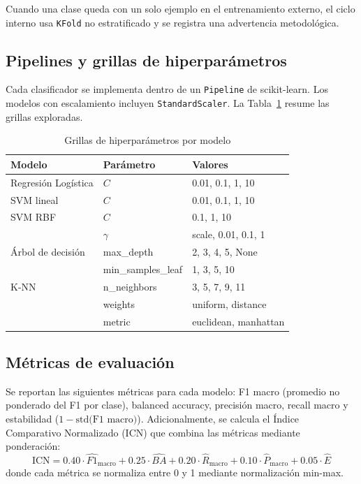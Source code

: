 \documentclass[conference]{IEEEtran}
\begin{document}
Cuando una clase queda con un solo ejemplo en el entrenamiento externo, el ciclo interno usa \texttt{KFold} no estratificado y se registra una advertencia metodológica.

\subsection{Pipelines y grillas de hiperparámetros}
Cada clasificador se implementa dentro de un \texttt{Pipeline} de scikit-learn. Los modelos con escalamiento incluyen \texttt{StandardScaler}. La Tabla~\ref{tab:grids} resume las grillas exploradas.

\begin{table}[h]
\centering
\caption{Grillas de hiperparámetros por modelo}
\label{tab:grids}
\begin{tabular}{lll}
\toprule
\textbf{Modelo} & \textbf{Parámetro} & \textbf{Valores} \\
\midrule
Regresión Logística & \(C\) & 0.01, 0.1, 1, 10 \\
SVM lineal & \(C\) & 0.01, 0.1, 1, 10 \\
SVM RBF & \(C\) & 0.1, 1, 10 \\
 & \(\gamma\) & scale, 0.01, 0.1, 1 \\
Árbol de decisión & max\_depth & 2, 3, 4, 5, None \\
 & min\_samples\_leaf & 1, 3, 5, 10 \\
K-NN & n\_neighbors & 3, 5, 7, 9, 11 \\
 & weights & uniform, distance \\
 & metric & euclidean, manhattan \\
\bottomrule
\end{tabular}
\end{table}

\subsection{Métricas de evaluación}
Se reportan las siguientes métricas para cada modelo: F1 macro (promedio no ponderado del F1 por clase), balanced accuracy, precisión macro, recall macro y estabilidad (\(1 - \text{std(F1 macro)}\)). Adicionalmente, se calcula el Índice Comparativo Normalizado (ICN) que combina las métricas mediante ponderación:
\begin{equation}
\text{ICN} = 0.40 \cdot \hat{F1}_{\text{macro}} + 0.25 \cdot \hat{BA} + 0.20 \cdot \hat{R}_{\text{macro}} + 0.10 \cdot \hat{P}_{\text{macro}} + 0.05 \cdot \hat{E}
\end{equation}
donde cada métrica se normaliza entre 0 y 1 mediante normalización min-max.
\end{document}
